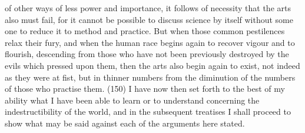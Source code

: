 of other ways of less power and importance, it follows of necessity that the arts also must fail, for it
cannot be possible to discuss science by itself without some one to reduce it to method and
practice. But when those common pestilences relax their fury, and when the human race begins
again to recover vigour and to flourish, descending from those who have not been previously
destroyed by the evils which pressed upon them, then the arts also begin again to exist, not indeed
as they were at fist, but in thinner numbers from the diminution of the numbers of those who
practise them. (150) I have now then set forth to the best of my ability what I have been able to
learn or to understand concerning the indestructibility of the world, and in the subsequent treatises I
shall proceed to show what may be said against each of the arguments here stated.


